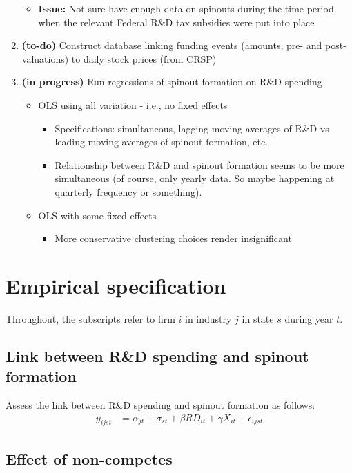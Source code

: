 \documentclass[12pt,english]{article}
\theoremstyle{remark}
\begin{document}
\begin{enumerate}
\begin{itemize}
		\item \textbf{Issue: } Not sure have enough data on spinouts during the time period when the relevant Federal R\&D tax subsidies were put into place
	\end{itemize}
	\item \textbf{(to-do)} Construct database linking funding events (amounts, pre- and post- valuations) to daily stock prices (from CRSP)
	\item \textbf{(in progress)} Run regressions of spinout formation on R\&D spending
	\begin{itemize}
		\item OLS using all variation - i.e., no fixed effects
		\begin{itemize}
			\item Specifications: simultaneous, lagging moving averages of R\&D vs leading moving averages of spinout formation, etc.
			\item Relationship between R\&D and spinout formation seems to be more simultaneous (of course, only yearly data. So maybe happening at quarterly frequency or something).
		\end{itemize}
		\item OLS with some fixed effects
		\begin{itemize}
			\item More conservative clustering choices render insignificant
		\end{itemize}
	\end{itemize}
\end{enumerate}

\section{Empirical specification}

Throughout, the subscripts refer to firm $i$ in industry $j$ in state $s$ during year $t$. 

\subsection{Link between R\&D spending and spinout formation}
 
Assess the link between R\&D spending and spinout formation as follows:
\begin{align*}
	y_{ijst} &= \alpha_{jt} + \sigma_{st} + \beta RD_{it} + \gamma X_{it} + \epsilon_{ijst}
\end{align*}

\subsection{Effect of non-competes}
\end{document}
